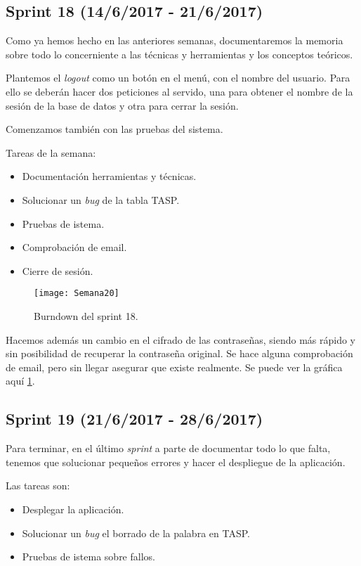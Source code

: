 \subsection{Sprint 18 (14/6/2017 - 21/6/2017)}

Como ya hemos hecho en las anteriores semanas, documentaremos la memoria sobre todo lo concerniente a las técnicas y herramientas y los conceptos teóricos.

Plantemos el \emph{logout} como un botón en el menú, con el nombre del usuario. Para ello se deberán hacer dos peticiones al servido, una para obtener el nombre de la sesión de la base de datos y otra para cerrar la sesión. 

Comenzamos también con las pruebas del sistema.

Tareas de la semana:
\begin{itemize}
\item Documentación herramientas y técnicas.
\item Solucionar un \emph{bug} de la tabla TASP.
\item Pruebas de istema.
\item Comprobación de email.
\item Cierre de sesión.
\end{itemize}

\begin{figure}[h]
\centering
\texttt{[image: Semana20]}
\caption{Burndown del sprint 18.}
\label{fig:A.17}
\end{figure}

Hacemos además un cambio en el cifrado de las contraseñas, siendo más rápido y sin posibilidad de recuperar la contraseña original. Se hace alguna comprobación de email, pero sin llegar asegurar que existe realmente. Se puede ver la gráfica aquí \ref{fig:A.17}.

\subsection{Sprint 19 (21/6/2017 - 28/6/2017)}

Para terminar, en el último \emph{sprint} a parte de documentar todo lo que falta, tenemos que solucionar pequeños errores y hacer el despliegue de la aplicación.

Las tareas son:
\begin{itemize}
\item Desplegar la aplicación.
\item Solucionar un \emph{bug} el borrado de la palabra en TASP.
\item Pruebas de istema sobre fallos.
\end{itemize}

